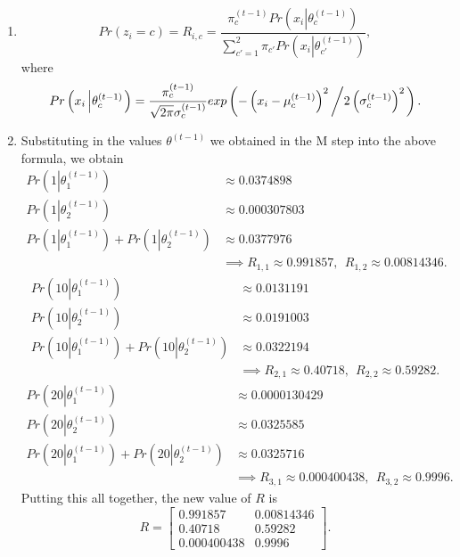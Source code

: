 \documentclass{article}
\newcommand{\bbm}{\begin{bmatrix}}
\newcommand{\ebm}{\end{bmatrix}}
\begin{document}
\begin{enumerate}
    \item 
    \[
        Pr(z_i=c)=R_{i,c} = \frac{\pi^{(t-1)}_cPr\left(x_i\left|\theta^{(t-1)}_c\right.\right)}{\sum^2_{c'=1}\pi_{c'}Pr\left(x_i\left|\theta_{c'}^{(t-1)}\right.\right)},
    \]
    where
    \[
        Pr\left(x_i\left|\theta^{(t-1)}_c\right.\right) = \frac{\pi_c^{(t-1)}}{\sqrt{2\pi}\sigma_c^{(t-1)}}exp\left(-\left(x_i-\mu_c^{(t-1)}\right)^2\left/2\left(\sigma^{(t-1)}_c\right)^2\right.\right).
    \]
    \item Substituting in the values $\theta^{(t-1)}$ we obtained in the M step into the above formula, we obtain
    \begin{align*}
        Pr\left(1\left|\theta^{(t-1)}_1\right.\right)&\approx 0.0374898 \\
        Pr\left(1\left|\theta^{(t-1)}_2\right.\right)&\approx 0.000307803\\
        Pr\left(1\left|\theta^{(t-1)}_1\right.\right)+Pr\left(1\left|\theta^{(t-1)}_2\right.\right)&\approx  0.0377976\\
        &\implies R_{1,1}\approx 0.991857,~~R_{1,2}\approx 0.00814346.
    \end{align*}
    \begin{align*}
        Pr\left(10\left|\theta^{(t-1)}_1\right.\right)&\approx 0.0131191 \\
        Pr\left(10\left|\theta^{(t-1)}_2\right.\right)&\approx  0.0191003\\
        Pr\left(10\left|\theta^{(t-1)}_1\right.\right)+Pr\left(10\left|\theta^{(t-1)}_2\right.\right)&\approx  0.0322194\\
        &\implies R_{2,1}\approx 0.40718,~~R_{2,2}\approx 0.59282.
    \end{align*}
    \begin{align*}
        Pr\left(20\left|\theta^{(t-1)}_1\right.\right)&\approx  0.0000130429\\
        Pr\left(20\left|\theta^{(t-1)}_2\right.\right)&\approx 0.0325585 \\
        Pr\left(20\left|\theta^{(t-1)}_1\right.\right)+Pr\left(20\left|\theta^{(t-1)}_2\right.\right)&\approx 0.0325716\\
        &\implies R_{3,1}\approx 0.000400438 ,~~R_{3,2}\approx 0.9996.
    \end{align*}
    Putting this all together, the new value of $R$ is 
    \[
        R=\bbm 0.991857 & 0.00814346 \\
        0.40718 & 0.59282 \\
        0.000400438 & 0.9996
        \ebm.
    \]
\end{enumerate}
\end{document}
